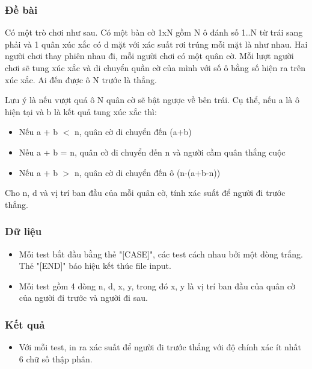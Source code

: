 



\subsubsection{   Đề bài  }

   Có một trò chơi như sau. Có một bàn cờ 1xN gồm N ô đánh số 1..N từ trái sang phải và 1 quân xúc xắc có d mặt với xác suất rơi trúng mỗi mặt là như nhau. Hai người chơi thay phiên nhau đi, mỗi người chơi có một quân cờ. Mỗi lượt người chơi sẽ tung xúc xắc và di chuyển quần cờ của mình với số ô bằng số hiện ra trên xúc xắc. Ai đến được ô N trước là thắng.  

   Lưu ý là nếu vượt quá ô N quân cờ sẽ bật ngược về bên trái. Cụ thể, nếu a là ô hiện tại và b là kết quả tung xúc xắc thì:  
\begin{itemize}
	\item     Nếu a + b $<$ n, quân cờ di chuyển đến (a+b)   
	\item     Nếu a + b = n, quân cờ di chuyển đến n và người cầm quân  thắng cuộc   
	\item     Nếu a + b $>$ n, quân cờ di chuyển đến ô (n-(a+b-n))   
\end{itemize}

   Cho n, d và vị trí ban đầu của mỗi quân cờ, tính xác suất để người đi trước thắng.  

\subsubsection{   Dữ liệu  }
\begin{itemize}
	\item     Mỗi test bắt đầu bằng thẻ "[CASE]", các test cách nhau bởi một dòng trắng. Thẻ "[END]" báo hiệu kết thúc file input.   
	\item     Mỗi test gồm 4 dòng n, d, x, y, trong đó x, y là vị trí ban đầu của quân cờ của người đi trước và người đi sau.   
\end{itemize}

\subsubsection{   Kết quả  }
\begin{itemize}
	\item     Với mỗi test, in ra xác suất để người đi trước thắng với độ chính xác ít nhất 6 chữ số thập phân.   
\end{itemize}

